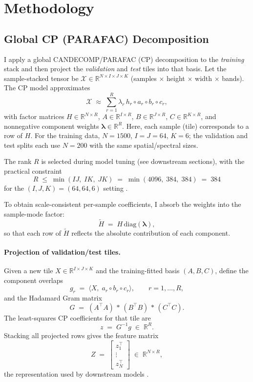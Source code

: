 \documentclass[11pt]{article}
\newcommand{\R}{\mathbb{R}}
\begin{document}
\section{Methodology}\label{sec:methodology}

\subsection{Global CP (PARAFAC) Decomposition}

I apply a global CANDECOMP/PARAFAC (CP) decomposition to the \emph{training} stack and then project the \emph{validation} and \emph{test} tiles into that basis. Let the sample-stacked tensor be \(\mathcal{X}\in\R^{N\times I\times J\times K}\) (samples \(\times\) height \(\times\) width \(\times\) bands). The CP model approximates
\[
\mathcal{X} \;\approx\; \sum_{r=1}^{R}\lambda_r \, h_r \!\circ a_r \!\circ b_r \!\circ c_r,
\]
with factor matrices \(H\in\R^{N\times R}\), \(A\in\R^{I\times R}\), \(B\in\R^{J\times R}\),
\(C\in\R^{K\times R}\), and nonnegative component weights \(\boldsymbol{\lambda}\in\R^{R}\).
Here, each sample (tile) corresponds to a row of \(H\).
For the training data, \(N=1500\), \(I=J=64\), \(K=6\); the validation and test splits each use \(N=200\) with the same spatial/spectral sizes.

\noindent The rank \(R\) is selected during model tuning (see downstream sections), with the practical constraint
\[
R \;\le\; \min(IJ,\;IK,\;JK) \;=\; \min(4096,\;384,\;384) \;=\; 384
\]
for the \((I,J,K)=(64,64,6)\) setting \parencite{KoldaBader2009,Bro1997}.

\noindent To obtain scale-consistent per-sample coefficients, I absorb the weights into the sample-mode factor:
\[
\tilde H \;=\; H\,\mathrm{diag}(\boldsymbol{\lambda}),
\]
so that each row of \(\tilde H\) reflects the absolute contribution of each component.

\paragraph{Projection of validation/test tiles.}
Given a new tile \(X\in\R^{I\times J\times K}\) and the training-fitted basis \((A,B,C)\),
define the component overlaps
\[
g_r \;=\; \big\langle X,\; a_r \circ b_r \circ c_r \big\rangle,\qquad r=1,\dots,R,
\]
and the Hadamard Gram matrix
\[
G \;=\; (A^\top A)\,\ast\,(B^\top B)\,\ast\,(C^\top C).
\]
The least-squares CP coefficients for that tile are
\[
z \;=\; G^{-1} g \;\in\; \R^{R}.
\]
Stacking all projected rows gives the feature matrix
\[
Z \;=\; \begin{bmatrix} z_1^{\top}\\ \vdots \\ z_N^{\top}\end{bmatrix}
\;\in\; \R^{N\times R},
\]
the representation used by downstream models \parencite{Kiers2000,SorensenBro2009}.
\end{document}
